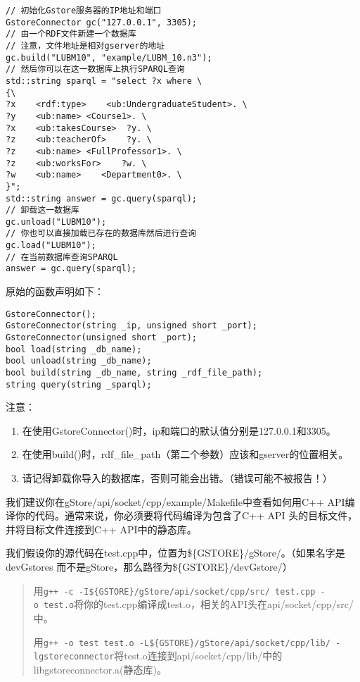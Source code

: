 \documentclass[titlepage, a4paper, 12pt]{article}
\begin{document}
\begin{verbatim}
// 初始化Gstore服务器的IP地址和端口
GstoreConnector gc("127.0.0.1", 3305);
// 由一个RDF文件新建一个数据库
// 注意，文件地址是相对gserver的地址
gc.build("LUBM10", "example/LUBM_10.n3");
// 然后你可以在这一数据库上执行SPARQL查询
std::string sparql = "select ?x where \
{\
?x    <rdf:type>    <ub:UndergraduateStudent>. \
?y    <ub:name> <Course1>. \
?x    <ub:takesCourse>  ?y. \
?z    <ub:teacherOf>    ?y. \
?z    <ub:name> <FullProfessor1>. \
?z    <ub:worksFor>    ?w. \
?w    <ub:name>    <Department0>. \
}";
std::string answer = gc.query(sparql);
// 卸载这一数据库
gc.unload("LUBM10");
// 你也可以直接加载已存在的数据库然后进行查询
gc.load("LUBM10");
// 在当前数据库查询SPARQL
answer = gc.query(sparql);
\end{verbatim}

原始的函数声明如下：

\begin{verbatim}
GstoreConnector();
GstoreConnector(string _ip, unsigned short _port);
GstoreConnector(unsigned short _port);
bool load(string _db_name);
bool unload(string _db_name);
bool build(string _db_name, string _rdf_file_path);
string query(string _sparql);
\end{verbatim}

注意：

\begin{enumerate}
	\item
	在使用GstoreConnector()时，ip和端口的默认值分别是127.0.0.1和3305。
	\item
	在使用build()时，rdf\_file\_path（第二个参数）应该和gserver的位置相关。
	\item
	请记得卸载你导入的数据库，否则可能会出错。（错误可能不被报告！）
\end{enumerate}


我们建议你在gStore/api/socket/cpp/example/Makefile中查看如何用C++ API编译你的代码。通常来说，你必须要将代码编译为包含了C++ API 头的目标文件，并将目标文件连接到C++ API中的静态库。

我们假设你的源代码在test.cpp中，位置为\$\{GSTORE\}/gStore/。（如果名字是devGstores 而不是gStore，那么路径为\$\{GSTORE\}/devGstore/）

\begin{quote}
	用\texttt{g++\ -c\ -I\$\{GSTORE\}/gStore/api/socket/cpp/src/\ test.cpp\ -o\ test.o}将你的test.cpp编译成test.o，相关的API头在api/socket/cpp/src/中。
	
	用\texttt{g++\ -o\ test\ test.o\ -L\$\{GSTORE\}/gStore/api/socket/cpp/lib/\ -lgstoreconnector}将test.o连接到api/socket/cpp/lib/中的libgstoreconnector.a(静态库)。
\end{quote}
\end{document}
